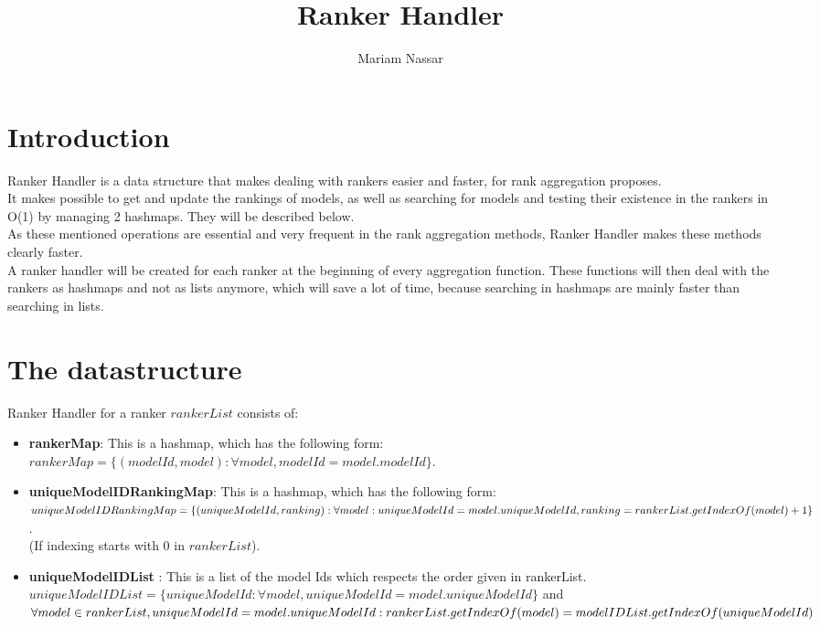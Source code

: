 \documentclass{article}
\title{Ranker Handler}
\author{Mariam Nassar}
\date{}
\begin{document}
	\maketitle
	
	\section{Introduction}
	Ranker Handler is a data structure that makes dealing with rankers easier and faster, for rank aggregation proposes.\\
	It makes possible to get and update the rankings of models, as well as searching for models and testing their existence in the rankers in O(1) by managing 2 hashmaps. They will be described below.\\
	As these mentioned operations are essential and very frequent in the rank aggregation methods, Ranker Handler makes these methods clearly faster.\\
	A ranker handler will be created for each ranker at the beginning of every aggregation function. These functions will then deal with the rankers as hashmaps and not as lists anymore, which will save a lot of time, because searching in hashmaps are mainly faster than searching in lists.
	
	\section{The datastructure}
	Ranker Handler for a ranker $rankerList$ consists of:
	\begin{itemize}
		\item \textbf{rankerMap}: This is a hashmap, which has the following form:\\
		$rankerMap = \{(modelId, model): \forall model, modelId = model.modelId\}$.
		
		\item \textbf{uniqueModelIDRankingMap}: This is a hashmap, which has the following form:\\
		$uniqueModelIDRankingMap = \{(uniqueModelId, ranking): \forall model:\\
		 uniqueModelId = model.uniqueModelId, 
		ranking = rankerList.getIndexOf(model)+1 \}$.\\
	    (If indexing starts with 0 in $rankerList$).
	    
	    \item \textbf{uniqueModelIDList} : This is a list of the model Ids which respects the order given in rankerList. 
	    $uniqueModelIDList = \{uniqueModelId: \forall model, uniqueModelId = model.uniqueModelId \}$ and\\
	    $\forall model \in rankerList,  uniqueModelId = model.uniqueModelId : \\
	    rankerList.getIndexOf(model) = modelIDList.getIndexOf(uniqueModelId) $		
	\end{itemize}	  
	
\end{document}
